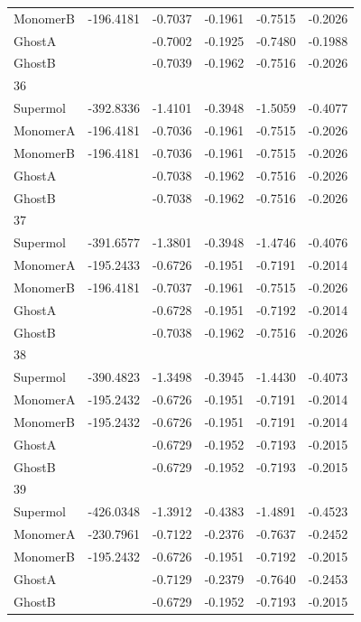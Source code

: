 \documentclass[journal=jctcce,manuscript=article]{achemso}
\begin{document}
\begin{spacing}{1}
\begin{longtable}{lRRRRR}
    MonomerB & -196.4181 & -0.7037 & -0.1961 & -0.7515 & -0.2026 \\
    GhostA &  & -0.7002 & -0.1925 & -0.7480 & -0.1988 \\
    GhostB &  & -0.7039 & -0.1962 & -0.7516 & -0.2026 \\
    36 &  &  &  &  &  \\
    Supermol & -392.8336 & -1.4101 & -0.3948 & -1.5059 & -0.4077 \\
    MonomerA & -196.4181 & -0.7036 & -0.1961 & -0.7515 & -0.2026 \\
    MonomerB & -196.4181 & -0.7036 & -0.1961 & -0.7515 & -0.2026 \\
    GhostA &  & -0.7038 & -0.1962 & -0.7516 & -0.2026 \\
    GhostB &  & -0.7038 & -0.1962 & -0.7516 & -0.2026 \\
    37 &  &  &  &  &  \\
    Supermol & -391.6577 & -1.3801 & -0.3948 & -1.4746 & -0.4076 \\
    MonomerA & -195.2433 & -0.6726 & -0.1951 & -0.7191 & -0.2014 \\
    MonomerB & -196.4181 & -0.7037 & -0.1961 & -0.7515 & -0.2026 \\
    GhostA &  & -0.6728 & -0.1951 & -0.7192 & -0.2014 \\
    GhostB &  & -0.7038 & -0.1962 & -0.7516 & -0.2026 \\
    38 &  &  &  &  &  \\
    Supermol & -390.4823 & -1.3498 & -0.3945 & -1.4430 & -0.4073 \\
    MonomerA & -195.2432 & -0.6726 & -0.1951 & -0.7191 & -0.2014 \\
    MonomerB & -195.2432 & -0.6726 & -0.1951 & -0.7191 & -0.2014 \\
    GhostA &  & -0.6729 & -0.1952 & -0.7193 & -0.2015 \\
    GhostB &  & -0.6729 & -0.1952 & -0.7193 & -0.2015 \\
    39 &  &  &  &  &  \\
    Supermol & -426.0348 & -1.3912 & -0.4383 & -1.4891 & -0.4523 \\
    MonomerA & -230.7961 & -0.7122 & -0.2376 & -0.7637 & -0.2452 \\
    MonomerB & -195.2432 & -0.6726 & -0.1951 & -0.7192 & -0.2015 \\
    GhostA &  & -0.7129 & -0.2379 & -0.7640 & -0.2453 \\
    GhostB &  & -0.6729 & -0.1952 & -0.7193 & -0.2015 \\

\end{longtable}
\end{spacing}
\end{document}
